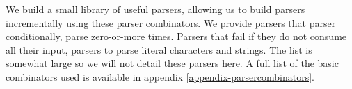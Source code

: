 We build a small library of useful parsers, allowing us to build parsers
incrementally using these parser combinators. We provide parsers that parser
conditionally, parse zero-or-more times. Parsers that fail if they do not
consume all their input, parsers to parse literal characters and strings. The
list is somewhat large so we will not detail these parsers here. A full list of
the basic combinators used is available in appendix \ref{appendix-parsercombinators}.
